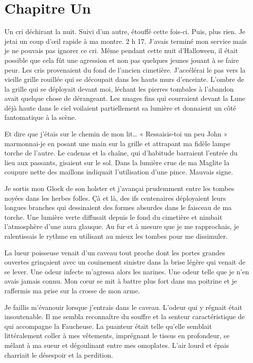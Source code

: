 \chapter[Chapitre Un]{Chapitre Un}
Un cri déchirant la nuit. Suivi d'un autre, étouffé cette fois-ci. Puis, plus rien. Je jetai un coup d'œil rapide à ma 
montre. 2 h 17. J'avais terminé mon service mais je ne pouvais pas ignorer ce cri. Même pendant cette nuit d'Halloween, 
il était possible que cela fût une agression et non pas quelques jeunes jouant à se faire peur. Les cris provenaient du 
fond de l'ancien cimetière. J'accélérai le pas vers la vieille grille rouillée qui se découpait dans les hauts murs 
d'enceinte. L'ombre de la grille qui se déployait devant moi, léchant les pierres tombales à l'abandon avait quelque 
chose de dérangeant. Les nuages fins qui courraient devant la Lune déjà haute dans le ciel voilaient partiellement sa 
lumière et donnaient un côté fantomatique à la scène.

Et dire que j'étais sur le chemin de mon lit\ldots{} « Ressaisis-toi un peu John » marmonnai-je en posant une main sur
la grille et attrapant ma fidèle lampe torche de l'autre. Le cadenas et la chaîne, qui d'habitude barraient l'entrée du 
lieu aux passants, gisaient sur le sol. Dans la lumière crue de ma Maglite la coupure nette des maillons indiquait 
l'utilisation d'une pince. Mauvais signe.

Je sortis mon Glock de son holster et j'avançai prudemment entre les tombes noyées dans les herbes folles. Çà et là, 
des ifs centenaires déployaient leurs longues branches qui dessinaient des formes absurdes dans le faisceau de ma 
torche. Une lumière verte diffusait depuis le fond du cimetière et nimbait l'atmosphère d'une aura glauque. Au fur et à 
mesure que je me rapprochais, je ralentissais le rythme en utilisant au mieux les tombes pour me dissimuler.

La lueur poisseuse venait d'un caveau tout proche dont les portes grandes ouvertes grinçaient avec un couinement 
sinistre dans la brise légère qui venait de se lever. Une odeur infecte m'agressa alors les narines. Une odeur telle 
que je n'en avais jamais connu. Mon cœur se mit à battre plus fort dans ma poitrine et je raffermis ma prise sur la 
crosse de mon arme.

Je faillis m'évanouir lorsque j'entrais dans le caveau. L'odeur qui y régnait était insoutenable. Il me sembla 
reconnaître du souffre et la senteur caractéristique de qui accompagne la Faucheuse. La puanteur était telle qu'elle 
semblait littéralement coller à mes vêtements, imprégnant le tissus en profondeur, se mêlant à ma sueur et dégoulinant 
entre mes omoplates. L'air lourd et épais charriait le désespoir et la perdition.

